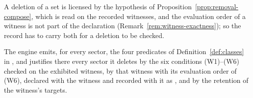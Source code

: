 
A deletion of a set is licensed by the hypothesis of
Proposition~\ref{prop:removal-compose}, which is read on the recorded
witnesses, and the evaluation order of a witness is not part of the
declaration (Remark~\ref{rem:witness-exactness}); so the record has to carry
both for a deletion to be checked.

\begin{requirement}\label{req:sector-report}
The engine emits, for every sector, the four predicates of
Definition~\ref{def:classes} in , and justifies there
every sector it deletes by the six conditions (W1)--(W6) checked on the
exhibited witness, by that witness with its evaluation order of (W6),
declared with the witness and recorded with it as
, and by the retention of the witness's
targets.
\end{requirement}
